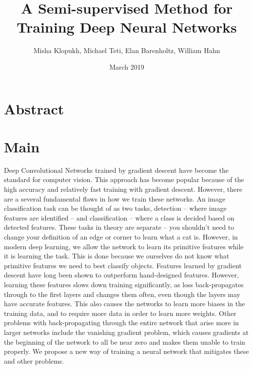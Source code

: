 \documentclass{article}
\title{A Semi-supervised Method for Training Deep Neural Networks}
\author{Misha Klopukh, Michael Teti, Elan Barenholtz, William Hahn}
\date{March 2019}
\begin{document}
\maketitle




\section{Abstract}

\section{Main}

Deep Convolutional Networks trained by gradient descent have become the standard for computer vision. This approach has become popular because of the high accuracy and relatively fast training with gradient descent.\cite{alexnet}\cite{Lecun98gradient} However, there are a several fundamental flaws in how we train these networks. An image classification task can be thought of as two tasks, detection -- where image features are identified -- and classification -- where a class is decided based on detected features. These tasks in theory are separate -- you shouldn't need to change your definition of an edge or corner to learn what a cat is.\cite{something} However, in modern deep learning, we allow the network to learn its primitive features while it is learning the task. This is done because we ourselves do not know what primitive features we need to best classify objects. Features learned by gradient descent have long been shown to outperform hand-designed features.\cite{learnvcraft} However, learning these features slows down training significantly, as loss back-propagates through to the first layers and changes them often, even though the layers may have accurate features. This also causes the networks to learn more biases in the training data, and to require more data in order to learn more weights. Other problems with back-propagating through the entire network that arise more in larger networks include the vanishing gradient problem, which causes gradients at the beginning of the network to all be near zero and makes them unable to train properly.\cite{vanishinggradients}\cite{learningproblems} We propose a new way of training a neural network that mitigates these and other problems.
\newline
\end{document}
